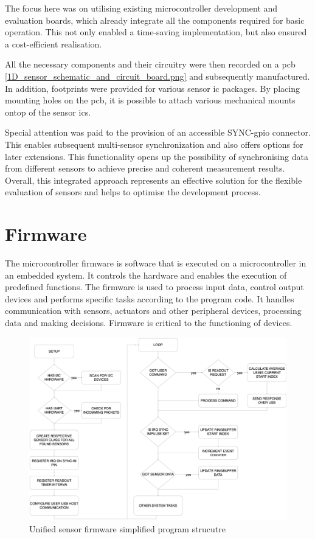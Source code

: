 The focus here was on utilising existing microcontroller development and
evaluation boards, which already integrate all the components required
for basic operation. This not only enabled a time-saving implementation,
but also ensured a cost-efficient realisation.

All the necessary components and their circuitry were then recorded on a
\gls{pcb} \ref{1D_sensor_schematic_and_circuit_board.png} and
subsequently manufactured. In addition, footprints were provided for
various sensor \gls{ic} packages. By placing mounting holes on the
\gls{pcb}, it is possible to attach various mechanical mounts ontop of
the sensor \gls{ic}s.

Special attention was paid to the provision of an accessible
SYNC-\gls{gpio} connector. This enables subsequent multi-sensor
synchronization and also offers options for later extensions. This
functionality opens up the possibility of synchronising data from
different sensors to achieve precise and coherent measurement results.
Overall, this integrated approach represents an effective solution for
the flexible evaluation of sensors and helps to optimise the development
process.

\hypertarget{firmware}{%
\section{Firmware}\label{firmware}}

The microcontroller firmware is software that is executed on a
microcontroller in an embedded system. It controls the hardware and
enables the execution of predefined functions. The firmware is used to
process input data, control output devices and performs specific tasks
according to the program code. It handles communication with sensors,
actuators and other peripheral devices, processing data and making
decisions. Firmware is critical to the functioning of devices.

\begin{figure}
\centering
\includegraphics{./generated_images/border_Unified_sensor_firmware_simplified_program_strucutre.png}
\caption{Unified sensor firmware simplified program strucutre
\label{Unified_sensor_firmware_simplified_program_strucutre.png}}
\end{figure}

